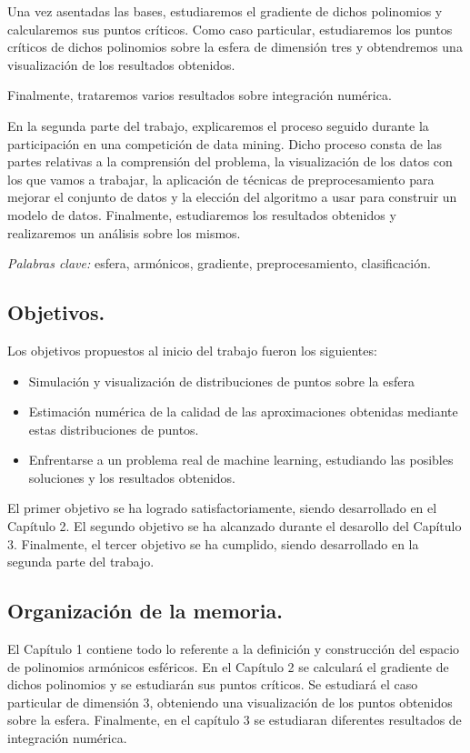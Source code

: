Una vez asentadas las bases, estudiaremos el gradiente de dichos polinomios y calcularemos sus puntos críticos. Como caso particular, estudiaremos los puntos críticos de dichos polinomios sobre la esfera de dimensión tres y obtendremos una visualización de los resultados obtenidos.

Finalmente, trataremos varios resultados sobre integración numérica.
\bigskip

En la segunda parte del trabajo, explicaremos el proceso seguido durante la participación en una competición de data mining. Dicho proceso consta de las partes relativas a la comprensión del problema, la visualización de los datos con los que vamos a trabajar, la aplicación de técnicas de preprocesamiento para mejorar el conjunto de datos y la elección del algoritmo a usar para construir un modelo de datos. Finalmente, estudiaremos los resultados obtenidos y realizaremos un análisis sobre los mismos. 
	
\bigskip
\emph{Palabras clave:} esfera, armónicos, gradiente, preprocesamiento, clasificación.
\newpage


\subsection*{Objetivos.}
Los objetivos propuestos al inicio del trabajo fueron los siguientes:
\begin{itemize}
	\item Simulación y visualización de distribuciones de puntos sobre la esfera
	\item Estimación numérica de la calidad de las aproximaciones obtenidas mediante estas distribuciones de puntos. 
	\item Enfrentarse a un problema real de machine learning, estudiando las posibles soluciones y los resultados obtenidos.
\end{itemize}

El primer objetivo se ha logrado satisfactoriamente, siendo desarrollado en el Capítulo 2. El segundo objetivo se ha alcanzado durante el desarollo del Capítulo 3. Finalmente, el tercer objetivo se ha cumplido, siendo desarrollado en la segunda parte del trabajo.

\subsection*{Organización de la memoria.}
\medskip

El Capítulo 1 contiene todo lo referente a la definición y construcción del espacio de polinomios armónicos esféricos.
En el Capítulo 2 se calculará el gradiente de dichos polinomios y se estudiarán sus puntos críticos. Se estudiará el caso particular de dimensión 3, obteniendo una visualización de los puntos obtenidos sobre la esfera.
Finalmente, en el capítulo 3 se estudiaran diferentes resultados de integración numérica.
\medskip

